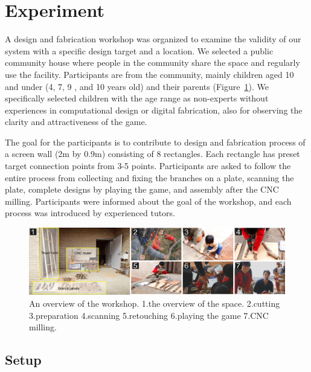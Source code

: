 \section{Experiment}
A design and fabrication workshop was organized to examine the validity of our system with a specific design target and a location.
We selected a public community house where people in the community share the space and regularly use the facility.
Participants are from the community, mainly children aged 10 and under (4, 7, 9 , and 10 years old) and their parents (Figure~\ref{fig:workshop}).
We specifically selected children with the age range as non-experts without experiences in computational design or digital fabrication, also for observing the clarity and attractiveness of the game.

The goal for the participants is to contribute to design and fabrication process of a screen wall (2m by 0.9m) consisting of 8 rectangles.
Each rectangle has preset target connection points from 3-5 points.
Participants are asked to follow the entire process from collecting and fixing the branches on a plate, scanning the plate, complete designs by playing the game, and assembly after the CNC milling.
Participants were informed about the goal of the workshop, and each process was introduced by experienced tutors.

\begin{figure}[ht]
  \begin{center}
    \includegraphics[width = 0.4\paperwidth]{images/fabrication/workshop_setup.png}
    \caption{An overview of the workshop. 1.the overview of the space. 2.cutting 3.preparation 4.scanning 5.retouching 6.playing the game 7.CNC milling.}
    \label{fig:workshop}
  \end{center}
\end{figure}

\subsection{Setup}
